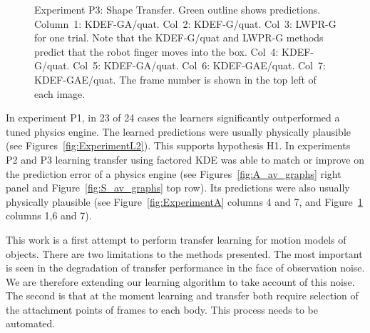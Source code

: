 \begin{figure}[tbp]
\caption {Experiment P3: Shape Transfer. Green outline shows predictions. Column~1: KDEF-GA/quat.
  Col~2: KDEF-G/quat. Col~3: LWPR-G for one trial.  Note that the
  KDEF-G/quat and LWPR-G methods predict that the robot finger moves
  into the box.  Col~4: KDEF-G/quat. Col~5: KDEF-GA/quat. Col~6:
  KDEF-GAE/quat. Col~7: KDEF-GAE/quat. The frame number is shown in
  the top left of each image.  }
\label{fig:ExperimentStransfer}
\end{figure}

 In experiment P1, in 23 of 24 cases the learners significantly outperformed a tuned physics engine. The learned predictions were usually physically plausible (see Figures~\ref{fig:ExperimentL2}). This supports hypothesis H1. In experiments P2 and P3 learning transfer using factored KDE was able to match or improve on the prediction error of a physics engine (see Figures~\ref{fig:A_av_graphs} right panel and Figure~\ref{fig:S_av_graphs} top row). Its predictions were also usually physically plausible (see Figure~\ref{fig:ExperimentA} columns 4 and 7, and Figure~\ref{fig:ExperimentStransfer} columns 1,6 and 7).

 This work is a first attempt to perform transfer learning for motion models of objects. There are two limitations to the methods presented. The most important is seen in the degradation of transfer performance in the face of observation noise. We are therefore extending our learning algorithm to take account of this noise.  The second is that at the moment learning and transfer both require selection of the attachment points of frames to each body. This process needs to be automated.



